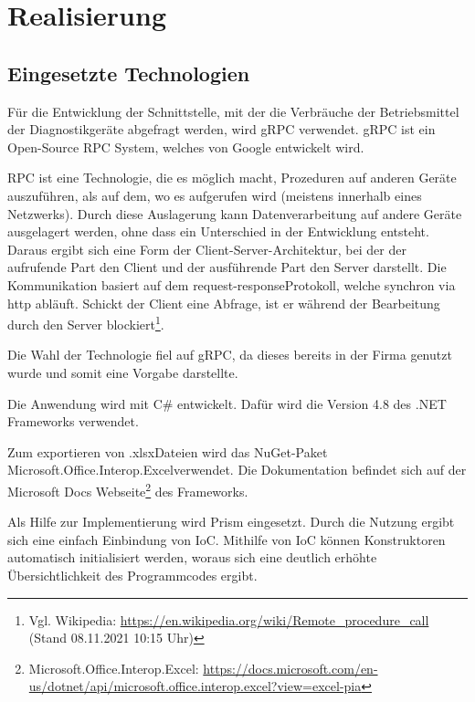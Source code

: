 \section{Realisierung}
\label{sec:Realisierung}

\subsection{Eingesetzte Technologien}
\label{sec:EingesetzteTechnologien}
Für die Entwicklung der Schnittstelle, mit der die Verbräuche der Betriebsmittel der Diagnostikgeräte abgefragt werden, wird {\acs{gRPC}} verwendet. {\acs{gRPC}} ist ein Open-Source {\acs{RPC}} System, welches von Google entwickelt wird.

{\acs{RPC}} ist eine Technologie, die es möglich macht, Prozeduren auf anderen Geräte auszuführen, als auf dem, wo es aufgerufen wird (meistens innerhalb eines Netzwerks). Durch diese Auslagerung kann Datenverarbeitung auf andere Geräte ausgelagert werden, ohne dass ein Unterschied in der Entwicklung entsteht. Daraus ergibt sich eine Form der Client-Server-Architektur, bei der der aufrufende Part den Client und der ausführende Part den Server darstellt. Die Kommunikation basiert auf dem \glqq request-response\grqq \space Protokoll, welche synchron via http abläuft. Schickt der Client eine Abfrage, ist er während der Bearbeitung durch den Server blockiert\footnote{Vgl. Wikipedia: \url{https://en.wikipedia.org/wiki/Remote_procedure_call} (Stand 08.11.2021 10:15 Uhr)}.

Die Wahl der Technologie fiel auf {\acs{gRPC}}, da dieses bereits in der Firma genutzt wurde und somit eine Vorgabe darstellte.

Die Anwendung wird mit C\# entwickelt. Dafür wird die Version 4.8 des .NET Frameworks verwendet.

Zum exportieren von \glqq .xlsx\grqq \space Dateien wird das {\acs{NuGet}}-Paket \glqq Microsoft.Office.Interop.Excel\grqq \space verwendet. Die Dokumentation befindet sich auf der Microsoft Docs Webseite\footnote{Microsoft.Office.Interop.Excel: \url{https://docs.microsoft.com/en-us/dotnet/api/microsoft.office.interop.excel?view=excel-pia}} des Frameworks.

Als Hilfe zur Implementierung wird {\acs{Prism}} eingesetzt. Durch die Nutzung ergibt sich eine einfach Einbindung von {\acs{IoC}}. Mithilfe von {\acs{IoC}} können Konstruktoren automatisch initialisiert werden, woraus sich eine deutlich erhöhte Übersichtlichkeit des Programmcodes ergibt.

